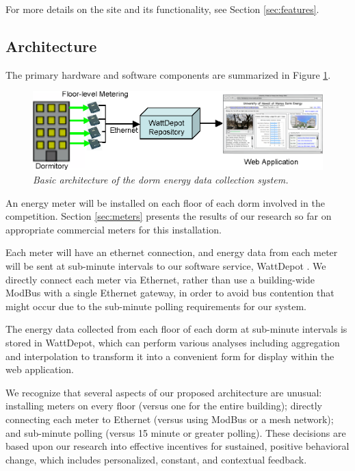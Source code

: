 \documentclass[11pt]{article}
\begin{document}
For more details on the site and its functionality, see Section \ref{sec:features}.

\subsection{Architecture}

The primary hardware and software components are summarized in Figure \ref{fig:architecture}.

\begin{figure}[!ht]
  \center
  \includegraphics[width=1.0\textwidth]{architecture.ppt.eps}
  \caption{\em \small Basic architecture of the dorm energy data collection system.}
 \label{fig:architecture}
\end{figure} 

An energy meter will be installed on each floor of each dorm involved in
the competition.  Section \ref{sec:meters} presents the results of our
research so far on appropriate commercial meters for this installation. 

Each meter will have an ethernet connection, and energy data from each
meter will be sent at sub-minute intervals to our software service,
WattDepot \cite{WattDepot}.  We directly connect each meter via Ethernet,
rather than use a building-wide ModBus with a single Ethernet gateway, in
order to avoid bus contention that might occur due to the sub-minute
polling requirements for our system.

The energy data collected from each floor of each dorm at sub-minute
intervals is stored in WattDepot, which can perform various analyses
including aggregation and interpolation to transform it into a
convenient form for display within the web application.

We recognize that several aspects of our proposed architecture are unusual:
installing meters on every floor (versus one for the entire building);
directly connecting each meter to Ethernet (versus using ModBus or a mesh
network); and sub-minute polling (versus 15 minute or greater polling).
These decisions are based upon our research into effective incentives for
sustained, positive behavioral change, which includes personalized,
constant, and contextual feedback.  
\end{document}
